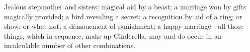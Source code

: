 Jealous stepmother and sisters; magical aid by a beast; a marriage won by gifts magically provided; a bird revealing a secret; a recognition by aid of a ring; or show; or what not; a démouement of punishment; a happy marriage - all those things, which in sequence, make up Cinderella, may and do occur in an incalculable number of other combinations.